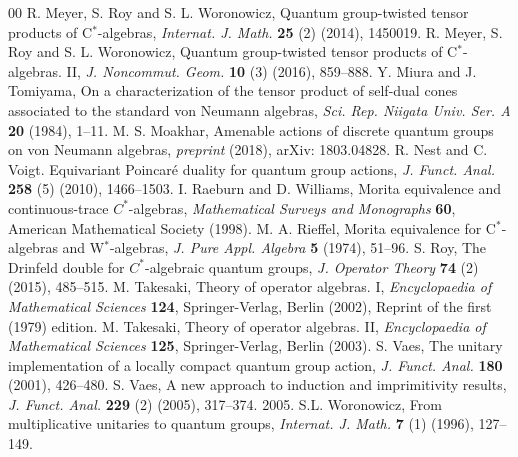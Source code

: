 \documentclass[reqno]{amsart}
\numberwithin{equation}{section}
\begin{document}
\begin{thebibliography}{00}
 R. Meyer, S. Roy and S. L.  Woronowicz, Quantum group-twisted tensor products of C$^*$-algebras, \emph{Internat. J. Math.} \textbf{25} (2) (2014), 1450019.
  R. Meyer, S. Roy and S. L.  Woronowicz, Quantum group-twisted tensor products of C$^*$-algebras. II, \emph{J. Noncommut. Geom.} \textbf{10} (3) (2016), 859--888.
 Y. Miura and J. Tomiyama, On a characterization of the tensor product of self-dual cones associated to the standard von {N}eumann algebras, \emph{Sci. Rep. Niigata Univ. Ser. A} \textbf{20} (1984), 1--11.
 M. S. Moakhar, Amenable actions of discrete quantum groups on von Neumann algebras, \emph{preprint} (2018), arXiv: 1803.04828.
 R. Nest and C. Voigt. Equivariant Poincar\'{e} duality for quantum group actions, \emph{J. Funct. Anal.} \textbf{258} (5) (2010), 1466--1503.
 I. Raeburn and D. Williams, Morita equivalence and continuous-trace {$C^*$}-algebras, \emph{Mathematical Surveys and Monographs} \textbf{60}, American Mathematical Society (1998). 
  M. A. Rieffel, Morita equivalence for C$^*$-algebras and W$^*$-algebras, \emph{J. Pure Appl. Algebra} \textbf{5} (1974), 51--96.
 S. Roy, The {D}rinfeld double for {$C^*$}-algebraic quantum groups, \emph{J. Operator Theory} \textbf{74} (2) (2015), 485--515.
 M. Takesaki, Theory of operator algebras. I, \emph{Encyclopaedia of Mathematical Sciences} \textbf{124}, Springer-Verlag, Berlin (2002), Reprint of the first (1979) edition.
 M. Takesaki, Theory of operator algebras. II, \emph{Encyclopaedia of Mathematical Sciences} \textbf{125},  Springer-Verlag, Berlin (2003). 
 S. Vaes, The unitary implementation of a locally compact quantum group action, \emph{J. Funct. Anal.} \textbf{180} (2001), 426--480.
  S. Vaes, A new approach to induction and imprimitivity results, \emph{J. Funct. Anal.} \textbf{229} (2) (2005), 317--374.
2005.
 S.L. Woronowicz, From multiplicative unitaries to quantum groups, \emph{Internat. J. Math.} \textbf{7} (1) (1996), 127--149.
\end{thebibliography}
\end{document}

